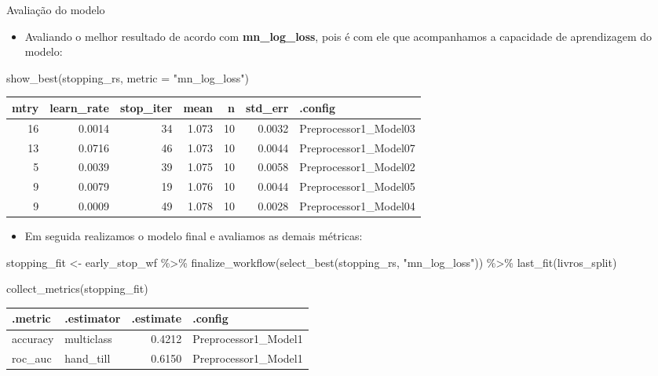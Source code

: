 \documentclass[
  9 pt,
  ignorenonframetext,
]{beamer}
\newenvironment{Shaded}{\begin{snugshade}}{\end{snugshade}}
\newcommand{\AttributeTok}[1]{\textcolor[rgb]{0.77,0.63,0.00}{#1}}
\newcommand{\FunctionTok}[1]{\textcolor[rgb]{0.00,0.00,0.00}{#1}}
\newcommand{\NormalTok}[1]{#1}
\newcommand{\OtherTok}[1]{\textcolor[rgb]{0.56,0.35,0.01}{#1}}
\newcommand{\SpecialCharTok}[1]{\textcolor[rgb]{0.00,0.00,0.00}{#1}}
\newcommand{\StringTok}[1]{\textcolor[rgb]{0.31,0.60,0.02}{#1}}
\providecommand{\tightlist}{%
  \setlength{\itemsep}{0pt}\setlength{\parskip}{0pt}}
\begin{document}
\begin{frame}[fragile]{Avaliação do modelo}
\begin{itemize}
\tightlist
\item
  Avaliando o melhor resultado de acordo com \textbf{mn\_log\_loss},
  pois é com ele que acompanhamos a capacidade de aprendizagem do
  modelo:
\end{itemize}

\begin{Shaded}
\begin{Highlighting}[]
\FunctionTok{show\_best}\NormalTok{(stopping\_rs, }\AttributeTok{metric =} \StringTok{"mn\_log\_loss"}\NormalTok{)}
\end{Highlighting}
\end{Shaded}

\begin{table}[H]
\centering
\begin{tabular}{rrrrrrl}
\toprule
mtry & learn\_rate & stop\_iter & mean & n & std\_err & .config\\
\midrule
16 & 0.0014 & 34 & 1.073 & 10 & 0.0032 & Preprocessor1\_Model03\\
13 & 0.0716 & 46 & 1.073 & 10 & 0.0044 & Preprocessor1\_Model07\\
5 & 0.0039 & 39 & 1.075 & 10 & 0.0058 & Preprocessor1\_Model02\\
9 & 0.0079 & 19 & 1.076 & 10 & 0.0044 & Preprocessor1\_Model05\\
9 & 0.0009 & 49 & 1.078 & 10 & 0.0028 & Preprocessor1\_Model04\\
\bottomrule
\end{tabular}
\end{table}

\begin{itemize}
\tightlist
\item
  Em seguida realizamos o modelo final e avaliamos as demais métricas:
\end{itemize}

\begin{Shaded}
\begin{Highlighting}[]
\NormalTok{stopping\_fit }\OtherTok{\textless{}{-}}\NormalTok{ early\_stop\_wf }\SpecialCharTok{\%\textgreater{}\%}
  \FunctionTok{finalize\_workflow}\NormalTok{(}\FunctionTok{select\_best}\NormalTok{(stopping\_rs, }\StringTok{"mn\_log\_loss"}\NormalTok{)) }\SpecialCharTok{\%\textgreater{}\%}
  \FunctionTok{last\_fit}\NormalTok{(livros\_split)}

\FunctionTok{collect\_metrics}\NormalTok{(stopping\_fit)}
\end{Highlighting}
\end{Shaded}

\begin{table}[H]
\centering
\begin{tabular}{llrl}
\toprule
.metric & .estimator & .estimate & .config\\
\midrule
accuracy & multiclass & 0.4212 & Preprocessor1\_Model1\\
roc\_auc & hand\_till & 0.6150 & Preprocessor1\_Model1\\
\bottomrule
\end{tabular}
\end{table}
\end{frame}
\end{document}

